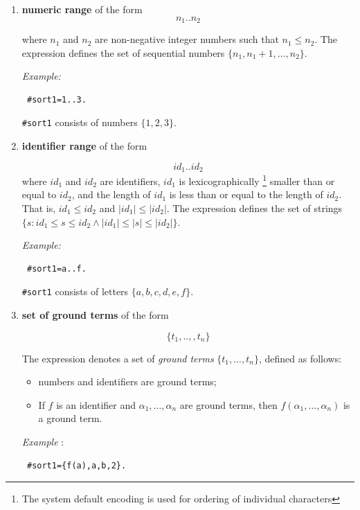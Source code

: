 \documentclass[12pt, letterpaper]{article}
\begin{document}
\begin{enumerate}

\item
\textbf{numeric range}  of the form
\begin{equation*}
n_1..n_2
\end{equation*}

where $n_1$ and $n_2$ are non-negative integer numbers such that $n_1 \le n_2$. The expression defines the set 
of sequential numbers $\{n_1, n_1+1, \dots, n_2\}$.

\textit{Example:}

\begin{verbatim}
 #sort1=1..3.
\end{verbatim}
\texttt{\#sort1} consists of numbers $\{1,2,3\}$.


\item \textbf{identifier range}  of the form

\begin{equation*}
  id_1..id_2
\end{equation*}
where $id_1$ and $id_2$ are identifiers, 
$id_1$ is lexicographically \footnote{ The system default encoding is used for  ordering of individual characters} smaller than or equal to  $id_2$, and the length of $id_1$ is less than or equal to the length of $id_2$. That is,  $id_1 \leq id_2$ and $|id_1| \leq |id_2|$.
The expression defines the set of strings  $\{s: id_1\leq s \leq id_2 \land |id_1|\leq |s| \leq |id_2|\}$.



\textit{Example:}

\begin{verbatim}
 #sort1=a..f.
\end{verbatim}

\texttt{\#sort1} consists of letters $\{a,b,c,d,e,f\}$.

\item \textbf{set of ground terms}  of the form


\begin{equation*}
\{t_1,..,,t_n\}
\end{equation*}

The expression denotes a set of \textit{ground terms} $\{t_1,...,t_n\}$, defined as follows:
\begin{itemize}
 \item numbers and identifiers are ground terms;
 \item If $f$ is an identifier and $\alpha_1, \dots, \alpha_n$ are ground terms, then $f(\alpha_1,\dots, \alpha_n)$ is a ground term.
\end{itemize}
\textit{Example} : 
\begin{verbatim}
 #sort1={f(a),a,b,2}.
\end{verbatim}







\end{enumerate}
\end{document}
